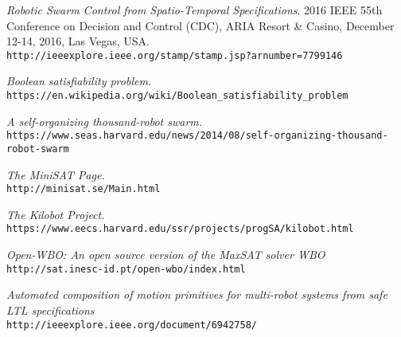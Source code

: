 \documentclass{article}[11pt]
\begin{document}
		\begin{thebibliography}{9}
			\author{Iman Haghighi, Sadra Sadraddini, and Calin Belta.}
			\textit{Robotic  Swarm  Control  from  Spatio-Temporal  Specifications}.
			2016 IEEE 55th Conference on Decision and Control (CDC), ARIA Resort \& Casino, December 12-14, 2016, Las Vegas, USA.\\
			\texttt{http://ieeexplore.ieee.org/stamp/stamp.jsp?arnumber=7799146} 			
			
			\author{Wikipedia}
			\textit{Boolean satisfiability problem}. \\
			\texttt{https://en.wikipedia.org/wiki/Boolean\_satisfiability\_problem} 
			
			\author{Caroline Perry.}
			\textit{A self-organizing thousand-robot swarm.}\\
			\texttt{https://www.seas.harvard.edu/news/2014/08/self-organizing-thousand-robot-swarm}
			
			\author{Niklas EÃ©n, Niklas SÃ¶rensson}
			\textit{The MiniSAT Page.}\\
			\texttt{http://minisat.se/Main.html}

			\author{Self Organizing Systems Research Group.}
			\textit{The Kilobot Project.}\\
			\texttt{https://www.eecs.harvard.edu/ssr/projects/progSA/kilobot.html}

			\author{Ruben Martins, Vasco Manquinho, Inês Lynce.}
			\textit{Open-WBO: An open source version of the MaxSAT solver WBO}\\
			\texttt{http://sat.inesc-id.pt/open-wbo/index.html}

			\author{Indranil Saha, Rattanachai Ramaithitima, Vijay Kumar}
			\textit{Automated composition of motion primitives for multi-robot systems from safe LTL specifications}\\
			\texttt{http://ieeexplore.ieee.org/document/6942758/}
		\end{thebibliography}
\end{document}
